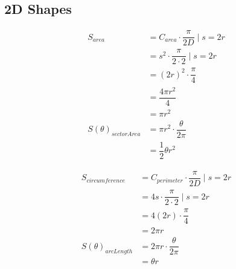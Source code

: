 \documentclass[12pt,letterpaper,twocolumn]{article}
\begin{document}
\subsection*{2D Shapes}
	\begin{align*}
		S_{area} &= C_{area} \cdot\dfrac{\pi}{2D} \mid  s=2r \\
		&= s^{2} \cdot\dfrac{\pi}{2\cdot 2} \mid s=2r\\
		&= (2r)^{2} \cdot\dfrac{\pi}{4} \\
		&= \dfrac{4\pi r^{2}}{4} \\
		&= \pi r^{2} \\
        S(\theta)_{sectorArea} &= \pi r^{2} \cdot \dfrac{\theta}{2\pi}  \\
        &= \dfrac{1}{2} \theta r^{2}  
	\end{align*}
	
	\begin{align*}
		S_{circumference} &= C_{perimeter} \cdot\dfrac{\pi}{2D} \mid  s=2r \\
		&= 4s \cdot\dfrac{\pi}{2\cdot 2} \mid s=2r\\
		&= 4(2r) \cdot\dfrac{\pi}{4} \\
		&= 2 \pi r \\
        S(\theta)_{arcLength} &= 2 \pi r \cdot \dfrac{\theta}{2\pi}  \\
        &= \theta r 
	\end{align*}
\end{document}
